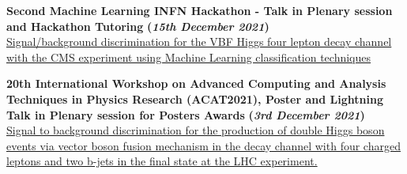 \documentclass[11pt]{res}
\begin{document}
\begin{resume}
											
\textbf{Second Machine Learning INFN Hackathon - Talk in Plenary session and Hackathon Tutoring} \textbf{(\textit{15th December 2021})}\\ 
\href{https://agenda.infn.it/event/28565/contributions/148551/}{Signal/background discrimination for the VBF Higgs four lepton decay channel with the CMS experiment using Machine Learning classification techniques}

\textbf{{20th International Workshop on Advanced Computing and Analysis Techniques in Physics Research (ACAT2021), Poster and Lightning Talk in Plenary session for Posters Awards} } \textbf{(\textit{3rd December 2021})}\\ 
\href{https://indico.cern.ch/event/855454/contributions/4596351/}{Signal to background discrimination for the production of double Higgs boson events via vector boson fusion mechanism in the decay channel with four charged leptons and two b-jets in the final state at the LHC experiment.}





\end{resume}
\end{document}
